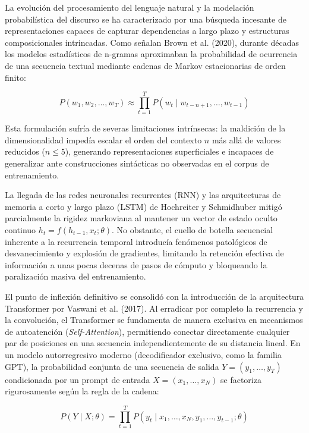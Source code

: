 La evolución del procesamiento del lenguaje natural y la modelación probabilística del discurso se ha caracterizado por una búsqueda incesante de representaciones capaces de capturar dependencias a largo plazo y estructuras composicionales intrincadas. Como señalan Brown et al. (2020), durante décadas los modelos estadísticos de n-gramas aproximaban la probabilidad de ocurrencia de una secuencia textual mediante cadenas de Markov estacionarias de orden finito:

\begin{equation}
P(w_1, w_2, \dots, w_T) \approx \prod_{t=1}^T P(w_t \mid w_{t-n+1}, \dots, w_{t-1})
\end{equation}

Esta formulación sufría de severas limitaciones intrínsecas: la maldición de la dimensionalidad impedía escalar el orden del contexto $n$ más allá de valores reducidos ($n \le 5$), generando representaciones superficiales e incapaces de generalizar ante construcciones sintácticas no observadas en el corpus de entrenamiento.

La llegada de las redes neuronales recurrentes (RNN) y las arquitecturas de memoria a corto y largo plazo (LSTM) de Hochreiter y Schmidhuber mitigó parcialmente la rigidez markoviana al mantener un vector de estado oculto continuo $h_t = f(h_{t-1}, x_t; \theta)$. No obstante, el cuello de botella secuencial inherente a la recurrencia temporal introducía fenómenos patológicos de desvanecimiento y explosión de gradientes, limitando la retención efectiva de información a unas pocas decenas de pasos de cómputo y bloqueando la paralización masiva del entrenamiento.

El punto de inflexión definitivo se consolidó con la introducción de la arquitectura Transformer por Vaswani et al. (2017). Al erradicar por completo la recurrencia y la convolución, el Transformer se fundamenta de manera exclusiva en mecanismos de autoatención (\textit{Self-Attention}), permitiendo conectar directamente cualquier par de posiciones en una secuencia independientemente de su distancia lineal. En un modelo autorregresivo moderno (decodificador exclusivo, como la familia GPT), la probabilidad conjunta de una secuencia de salida $Y = (y_1, \dots, y_T)$ condicionada por un prompt de entrada $X = (x_1, \dots, x_N)$ se factoriza rigurosamente según la regla de la cadena:

\begin{equation}
P(Y \mid X; \theta) = \prod_{t=1}^T P(y_t \mid x_1, \dots, x_N, y_1, \dots, y_{t-1}; \theta)
\end{equation}

